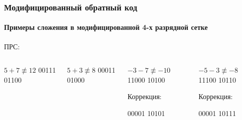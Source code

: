 \begin{frame}
    \frametitle{Модифицированный обратный код}
    \framesubtitle{Примеры сложения в модифицированной 4-х разрядной сетке}
    
    ПРС:
    \begin{columns}
            \begin{block}{$5+7\not\equiv 12$}
                 \center
                          {00111}
                          {01100}
            \end{block}
            \begin{block}{$5+3\not\equiv 8$}
                 \center
                          {00011}
                          {01000}
            \end{block}
            \begin{block}{$-3-7\not\equiv -10$}
                 \center
                          {11000}
                          {10100}
                          
                 Коррекция:
                 
                          {00001}
                          {10101}
            \end{block}
            \begin{block}{$-5-3\not\equiv -8$}
                 \center
                          {11100}
                          {10110}
                          
                 Коррекция:
                 
                          {00001}
                          {10111}
            \end{block}
    \end{columns}
\end{frame}

